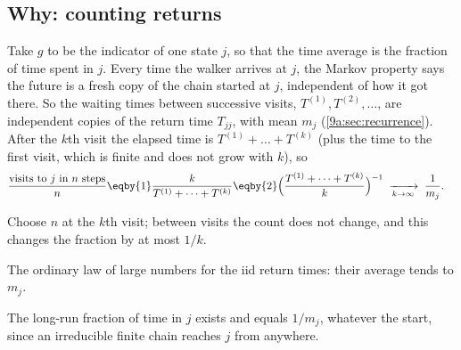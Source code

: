 \subsection{Why: counting returns}
\label{9a:sec:kac}

Take $g$ to be the indicator of one state $j$, so that the time average is the fraction of time
spent in $j$. Every time the walker arrives at $j$, the Markov property says the future is a
fresh copy of the chain started at $j$, independent of how it got there. So the waiting times
between successive visits, $T^{(1)},T^{(2)},\dots$, are independent copies of the return time
$T_{jj}$, with mean $m_j$ (\cref{9a:sec:recurrence}). After the $k$th visit the elapsed time is
$T^{(1)}+\dots+T^{(k)}$ (plus the time to the first visit, which is finite and does not grow with
$k$), so
\begin{align}
  \frac{\text{visits to }j\text{ in }n\text{ steps}}{n}
  &\eqby{1}\frac{k}{T^{(1)}+\dots+T^{(k)}}
  \eqby{2}\Bigl(\frac{T^{(1)}+\dots+T^{(k)}}{k}\Bigr)^{-1}
  \;\xrightarrow[k\to\infty]{}\;\frac1{m_j}.
  \label{9a:eq:kac-frac}
\end{align}
\begin{explain}
  \item Choose $n$ at the $k$th visit; between visits the count does not change, and this
        changes the fraction by at most $1/k$.
  \item The ordinary law of large numbers for the iid return times: their average tends to
        $m_j$.
\end{explain}
The long-run fraction of time in $j$ exists and equals $1/m_j$, whatever the start, since an
irreducible finite chain reaches $j$ from anywhere.

